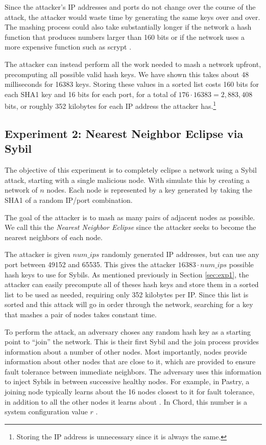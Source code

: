 \documentclass[11pt,conference]{IEEEtran}
\begin{document}
Since the attacker's IP addresses and ports do not change over the course of the attack, the attacker would waste time by generating the same keys over and over. 
The mashing process could also take substantially longer if the network a hash function that produces numbers larger than 160 bits or if the network uses a more expensive function such as scrypt \cite{scrypt}.

The attacker can instead perform all the work needed to mash a network upfront, precomputing all possible valid hash keys.
We have shown this takes about 48 milliseconds for 16383 keys.
Storing these values in a sorted list costs 160 bits for each SHA1 key and 16 bits for each port, for a total of $176  \cdot 16383 = 2,883,408$ bits, or roughly 352 kilobytes for each IP address the attacker has.\footnote{Storing the IP address is unnecessary since it is always the same.}




\subsection{Experiment 2:  Nearest Neighbor Eclipse via Sybil} %
\label{sec:exp2}
The objective of this experiment is to completely eclipse a network using a Sybil attack, starting with a single malicious node.
With simulate this by creating a network of $n$ nodes.
Each node is represented by a key generated by taking the SHA1 of a random IP/port combination.

The goal of the attacker is to mash as many pairs of adjacent nodes as possible.
We call this the \textit{Nearest Neighbor Eclipse} since the attacker seeks to become the nearest neighbors of each node.

The attacker is given $num\_ips$ randomly generated IP addresses, but can use any port between 49152 and 65535.
This gives the attacker $ 16383 \cdot num\_ips $ possible hash keys to use for Sybils.
As mentioned previously in Section \ref{sec:exp1}, the attacker can easily precompute all of theses hash keys and store them in a sorted list to be used as needed, requiring only 352 kilobytes per IP.
Since this list is sorted and this attack will go in order through the network, searching for a key that mashes a pair of nodes takes constant time.

To perform the attack, an adversary choses any random hash key as a starting point to ``join'' the network.
This is their first Sybil and the join process provides information about a number of other nodes.
Most importantly, nodes provide information about other nodes that are close to it, which are provided to ensure fault tolerance between immediate neighbors.
The adversary uses this information to inject Sybils in between successive healthy nodes.
For example, in Pastry, a joining node typically learns about the 16 nodes closest to it for fault tolerance, in addition to all the other nodes it learns about  \cite{pastry}.
In Chord, this number is a system configuration value $r$ \cite{chord}.
\end{document}
